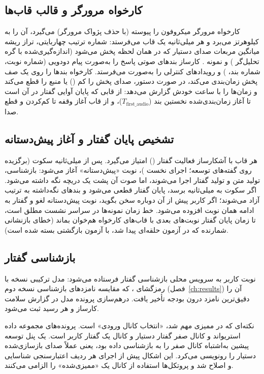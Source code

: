 \subsection{کارخواه مرورگر و قالب قاب‌ها}

کارخواه مرورگر میکروفون را پیوسته (با حذف پژواک مرورگر) می‌گیرد، آن را به
 کیلوهرتز می‌برد و هر  میلی‌ثانیه یک قاب می‌فرستد: شماره ترتیب
چهاربایتی، تراز ریشه میانگین مربعات صدای دستیار که در همان لحظه پخش می‌شود
(اندازه‌گیری‌شده با گره تحلیل‌گر ) و  نمونه
. کارساز بندهای صوتی پاسخ را به‌صورت پیام دودویی (شماره نوبت،
شماره بند، ) و رویدادهای کنترلی را به‌صورت  می‌فرستد.
کارخواه بندها را روی یک صف پخش زمان‌بندی می‌کند، در صورت دستور، صدای پخش را
کم () یا منبع را قطع می‌کند و زمان‌ها را با ساعت خودش گزارش می‌دهد:
از قابی که پایان آوایی گفتار در آن است تا آغاز زمان‌بندی‌شده نخستین بند
($T_{\text{first\_audio}}$)، و از قاب آغاز وقفه تا کم‌کردن و قطع صدا.

\subsection{تشخیص پایان گفتار و آغاز پیش‌دستانه}

هر قاب با آشکارساز فعالیت گفتار  () امتیاز می‌گیرد.
پس از  میلی‌ثانیه سکوت (برگزیده روی گفته‌های توسعه؛ اجرای نخست )،
نوبت «پیش‌دستانه» آغاز می‌شود: بازشناسی،
تولید متن و تولید گفتار اجرا می‌شوند، اما صوت آن پشت یک دریچه نگه داشته
می‌شود. اگر سکوت به  میلی‌ثانیه برسد، پایان گفتار قطعی می‌شود و
بندهای نگه‌داشته به ترتیب آزاد می‌شوند؛ اگر کاربر پیش از آن دوباره سخن
بگوید، نوبت پیش‌دستانه لغو و گفتار به ادامه همان نوبت افزوده می‌شود. خط زمان
نمونه‌ها در سراسر نشست مطلق است، تا زمان پایان گفتار نوبت‌های بعدی با قاب‌های
کارخواه هم‌خوان بماند (خطای بازنشانی شمارنده که در آزمون حلقه‌ای پیدا شد، با
آزمون بازگشتی بسته شده است).

\subsection{بازشناسی گفتار}

نوبت کاربر به سرویس محلی بازشناسی گفتار فرستاده می‌شود: مدل ترکیبی
 نسخه  با رمزگشای ، که مقایسه نامزدهای
بازشناسی نسخه دوم (فصل~\ref{ch:results}) آن را دقیق‌ترین نامزد درون بودجه
تأخیر یافت. درهم‌سازی پرونده مدل در گزارش سلامت کارساز و هر رسید ثبت
می‌شود.

نکته‌ای که در ممیزی مهم شد، «انتخاب کانال ورودی» است. پرونده‌های
مجموعه داده استریو‌اند و کانال صفر گفتار دستیار و کانال یک گفتار کاربر
است. یک پنل توسعه پیشین به‌اشتباه کانال صفر را به بازشناسی داده بود، یعنی
عملاً صدای بازسازی‌شده دستیار را رونویسی می‌کرد. این اشکال پیش از اجرای هر
ردیف اعتبارسنجی شناسایی و اصلاح شد و پروتکل‌ها استفاده از کانال یک
«ممیزی‌شده» را الزامی می‌کنند.

